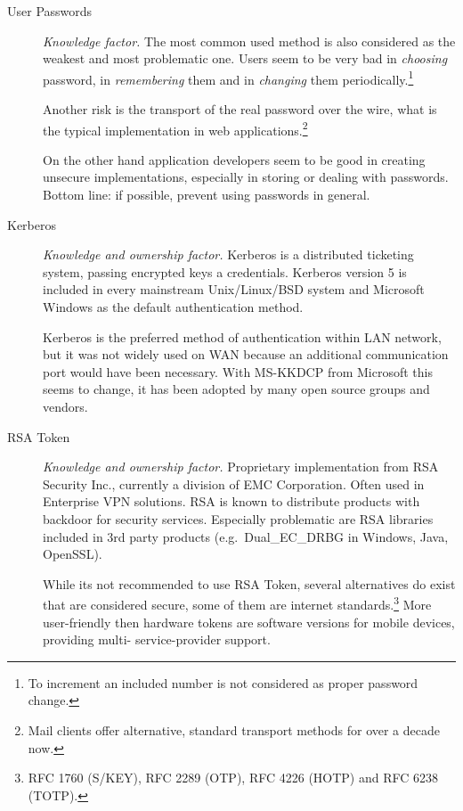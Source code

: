 \begin{description}

    \item[User Passwords] \emph{Knowledge factor.}  The most common used
        method is also considered as the weakest and most problematic
        one.  Users seem to be very bad in \emph{choosing} password, in
        \emph{remembering} them and in \emph{changing} them
        periodically.\footnote{To increment an included number is not
        considered as proper password change.}
            
        Another risk is the transport of the real password over the
        wire, what is the typical implementation in web
        applications.\footnote{Mail clients offer alternative, standard
        transport methods for over a decade now.}
        
        On the other hand application developers seem to be good in
        creating unsecure implementations, especially in storing or
        dealing with passwords. Bottom line: if possible, prevent using
        passwords in general.
    
    \item[Kerberos] \emph{Knowledge and ownership factor.}  Kerberos is
        a distributed ticketing system, passing encrypted keys a
        credentials. Kerberos version 5 is included in every mainstream
        Unix/Linux/BSD system and Microsoft Windows as the default
        authentication method.
        
        Kerberos is the preferred method of authentication within LAN
        network, but it was not widely used on WAN because an additional
        communication port would have been necessary. With MS-KKDCP from
        Microsoft this seems to change, it has been adopted by many open
        source groups and vendors.
        
    \item[RSA Token] \emph{Knowledge and ownership factor.}  Proprietary
        implementation from RSA Security Inc., currently a division of
        EMC Corporation. Often used in Enterprise VPN solutions. RSA is
        known to distribute products with backdoor for security
        services.  Especially problematic are RSA libraries included in
        3rd party products (e.g.\ Dual\_EC\_DRBG in Windows, Java,
        OpenSSL).

        While its not recommended to use RSA Token, several alternatives
        do exist that are considered secure, some of them are internet
        standards.\footnote{RFC 1760 (S/KEY), RFC 2289 (OTP), RFC 4226
        (HOTP) and RFC 6238 (TOTP).} More user-friendly then hardware
        tokens are software versions for mobile devices, providing multi-
        service-provider support.


\end{description}
